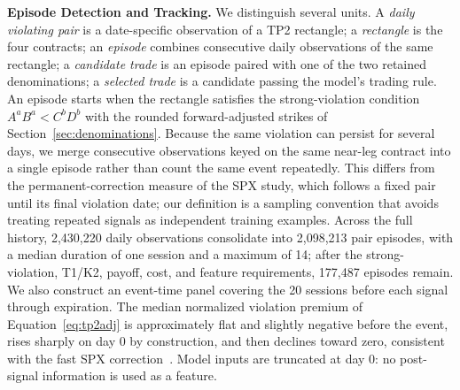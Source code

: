 \documentclass[sigconf,review,anonymous]{acmart}
\begin{document}
\smallskip\noindent\textbf{Episode Detection and Tracking.}
\label{sec:episode-tracking}
We distinguish several units. A \emph{daily violating pair} is a date-specific observation of a TP2 rectangle; a \emph{rectangle} is the four contracts; an \emph{episode} combines consecutive daily observations of the same rectangle; a \emph{candidate trade} is an episode paired with one of the two retained denominations; a \emph{selected trade} is a candidate passing the model's trading rule.
An episode starts when the rectangle satisfies the strong-violation condition $A^aB^a<C^bD^b$ with the rounded forward-adjusted strikes of Section~\ref{sec:denominations}. Because the same violation can persist for several days, we merge consecutive observations keyed on the same near-leg contract into a single episode rather than count the same event repeatedly. This differs from the permanent-correction measure of the SPX study, which follows a fixed pair until its final violation date; our definition is a sampling convention that avoids treating repeated signals as independent training examples. Across the full history, 2{,}430{,}220 daily observations consolidate into 2{,}098{,}213 pair episodes, with a median duration of one session and a maximum of 14; after the strong-violation, T1/K2, payoff, cost, and feature requirements, 177{,}487 episodes remain.
We also construct an event-time panel covering the 20 sessions before each signal through expiration. The median normalized violation premium of Equation~\eqref{eq:tp2adj} is approximately flat and slightly negative before the event, rises sharply on day 0 by construction, and then declines toward zero, consistent with the fast SPX correction~\cite{glasserman2025tp2}. Model inputs are truncated at day 0: no post-signal information is used as a feature.
\end{document}
